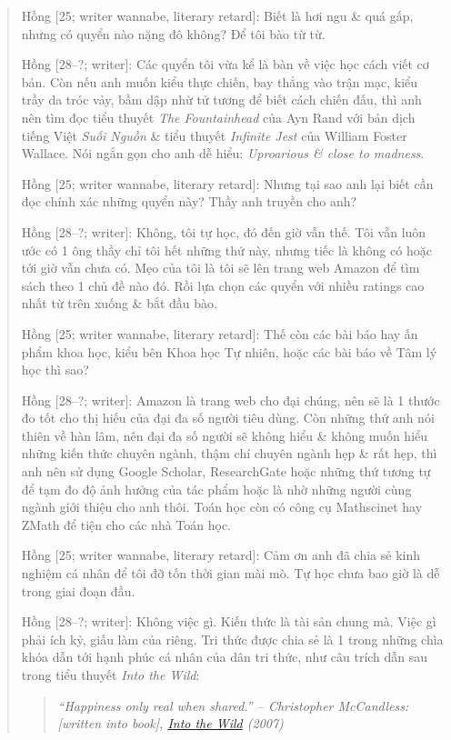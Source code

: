 \documentclass[12pt]{article}
\begin{document}
\begin{quotation}
	{\sf Hồng [25; writer wannabe, literary retard]}: Biết là hơi ngu \& quá gấp, nhưng có quyển nào nặng đô không? Để tôi bào từ từ.
	
	{\sf Hồng [28--?; writer]}: Các quyển tôi vừa kể là bàn về việc học cách viết cơ bản. Còn nếu anh muốn kiểu thực chiến, bay thẳng vào trận mạc, kiểu trầy da tróc vảy, bầm dập nhừ tử tương để biết cách chiến đấu, thì anh nên tìm đọc tiểu thuyết {\it The Fountainhead} của {\sc Ayn Rand} với bản dịch tiếng Việt {\it Suối Nguồn} \cite{Rand_fountainhead} \& tiểu thuyết {\it Infinite Jest} \cite{Wallace2011} của {\sc William Foster Wallace}. Nói ngắn gọn cho anh dễ hiểu: {\it Uproarious \& close to madness}.
	
	{\sf Hồng [25; writer wannabe, literary retard]}: Nhưng tại sao anh lại biết cần đọc chính xác những quyển này? Thầy anh truyền cho anh?
	
	{\sf Hồng [28--?; writer]}: Không, tôi tự học, đó đến giờ vẫn thế. Tôi vẫn luôn ước có 1 ông thầy chỉ tôi hết những thứ này, nhưng tiếc là không có hoặc tới giờ vẫn chưa có. Mẹo của tôi là tôi sẽ lên trang web Amazon để tìm sách theo 1 chủ đề nào đó. Rồi lựa chọn các quyển với nhiều ratings cao nhất từ trên xuống \& bắt đầu bào.
	
	{\sf Hồng [25; writer wannabe, literary retard]}: Thế còn các bài báo hay ấn phẩm khoa học, kiểu bên Khoa học Tự nhiên, hoặc các bài báo về Tâm lý học thì sao?
	
	{\sf Hồng [28--?; writer]}: Amazon là trang web cho đại chúng, nên sẽ là 1 thước đo tốt cho thị hiếu của đại đa số người tiêu dùng. Còn những thứ anh nói thiên về hàn lâm, nên đại đa số người sẽ không hiểu \& không muốn hiểu những kiến thức chuyên ngành, thậm chí chuyên ngành hẹp \& rất hẹp, thì anh nên sử dụng Google Scholar, ResearchGate hoặc những thứ tương tự để tạm đo độ ảnh hưởng của tác phẩm hoặc là nhờ những người cùng ngành giới thiệu cho anh thôi. Toán học còn có công cụ Mathscinet hay ZMath để tiện cho các nhà Toán học.
	
	{\sf Hồng [25; writer wannabe, literary retard]}: Cảm ơn anh đã chia sẻ kinh nghiệm cá nhân để tôi đỡ tốn thời gian mài mò. Tự học chưa bao giờ là dễ trong giai đoạn đầu.
	
	{\sf Hồng [28--?; writer]}: Không việc gì. Kiến thức là tài sản chung mà. Việc gì phải ích kỷ, giấu làm của riêng. Tri thức được chia sẻ là 1 trong những chìa khóa dẫn tới hạnh phúc cá nhân của dân tri thức, như câu trích dẫn sau trong tiểu thuyết {\it Into the Wild}:
	\begin{quotation}\it
		``Happiness only real when shared.'' -- {\sc Christopher McCandless}: {\rm[written into book]}, \href{https://www.imdb.com/title/tt0758758}{\it Into the Wild} (2007)
	\end{quotation}
\end{quotation}
\end{document}
